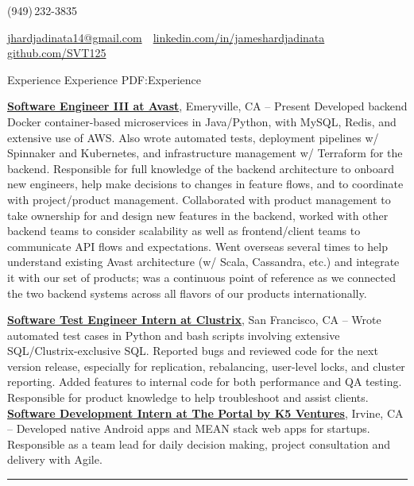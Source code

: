 \documentclass[letterpaper,MMMyyyy,nonstopmode]{simpleresumecv}
\makeatletter
\newcommand{\ResumeAuthor}{James Hardjadinata}
\newcommand{\ResumeWebsite}{github.com/SVT125}
\newcommand{\ResumeLinkedin}{linkedin.com/in/jameshardjadinata}
\newcommand{\ResumeEmail}{jhardjadinata14@gmail.com}
\makeatother
\begin{document}

\Title{\ResumeAuthor}
\begin{SubTitle}
	(949)\,232-3835
	\par
	\href{mailto:\ResumeEmail}
	{\ResumeEmail}
	\,\textbullet\,
	\href{\ResumeLinkedin}
	{\url{\ResumeLinkedin}}\,
	\,\textbullet\,
	\href{\ResumeWebsite}
	{\url{\ResumeWebsite}}
\end{SubTitle}

\begin{Body}


	\Section
	{Experience}
	{Experience}
	{PDF:Experience}

	\Entry
	\href{https://www.locationlabs.com/}
	{\textbf{Software Engineer III at Avast}},
	Emeryville, CA
	\hfill
	 --
	Present
	\Gap
	\BulletItem Developed backend Docker container-based microservices in Java/Python, with MySQL, Redis, and extensive use of AWS.
	\BulletItem Also wrote automated tests, deployment pipelines w/ Spinnaker and Kubernetes, and infrastructure management w/ Terraform for the backend.
	\BulletItem Responsible for full knowledge of the backend architecture to onboard new engineers, help make decisions to changes in feature flows, and to coordinate with project/product management.
	\BulletItem Collaborated with product management to take ownership for and design new features in the backend, worked with other backend teams to consider scalability as well as frontend/client teams to communicate API flows and expectations.
	\BulletItem Went overseas several times to help understand existing Avast architecture (w/ Scala, Cassandra, etc.) and integrate it with our set of products; was a continuous point of reference as we connected the two backend systems across all flavors of our products internationally.
	\newline

	\Entry
	\href{http://www.clustrix.com/}
	{\textbf{Software Test Engineer Intern at Clustrix}},
	San Francisco, CA
	\hfill
	 --
	\Gap
	\BulletItem Wrote automated test cases in Python and bash scripts involving extensive SQL/Clustrix-exclusive SQL.
	\BulletItem Reported bugs and reviewed code for the next version release, especially for replication, rebalancing, user-level locks, and cluster reporting.
	\BulletItem Added features to internal code for both performance and QA testing. 
	\BulletItem Responsible for product knowledge to help troubleshoot and assist clients.
	\newline
	\Entry
	\href{http://www.theportal.io/}
	{\textbf{Software Development Intern at The Portal by K5 Ventures}},
	Irvine, CA
	\hfill
	 --
	\Gap
	\BulletItem Developed native Android apps and MEAN stack web apps for startups.
	\BulletItem Responsible as a team lead for daily decision making, project consultation and delivery with Agile.\newline
	\hrule


\end{Body}
\end{document}
